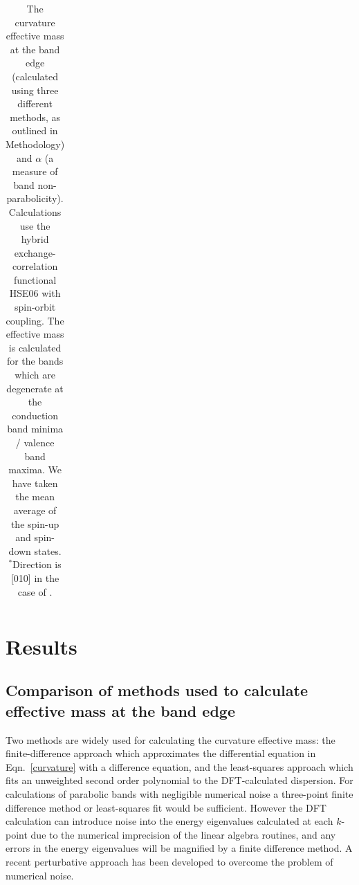 \begin{landscape}
\begin{table}[tb]
\begin{tabular}{@{}lclllclllclllclll@{}}
\end{tabular} 
\caption[Values of effective mass and $\alpha$ (a measure of non-parabolicity) for GaAs, CdTe,  and CZTS]{\label{largetable} The curvature effective mass at the band edge (calculated using three different methods, as outlined in Methodology) and $\alpha$ (a measure of band non-parabolicity). Calculations use the hybrid exchange-correlation functional HSE06 with spin-orbit coupling. The effective mass is calculated for the bands which are degenerate at the conduction band minima / valence band maxima. We have taken the mean average of the spin-up and spin-down states. $^*$Direction is [010] in the case of . }
\end{table}
\end{landscape}

\section{Results}

\subsection{Comparison of methods used to calculate effective mass at the band edge}

Two methods are widely used for calculating the curvature effective mass:
the finite-difference approach which approximates the differential equation in Eqn.\ \ref{curvature} with a difference equation,
and the least-squares approach which fits an unweighted second order polynomial to the DFT-calculated dispersion. 
For calculations of parabolic bands with negligible numerical noise a three-point finite difference method or least-squares fit would be sufficient. 
However the DFT calculation can introduce noise into the energy eigenvalues calculated at each $k$-point due to the numerical imprecision of the linear algebra routines,
and any errors in the energy eigenvalues will be magnified by a finite difference method.\autocite{Nearing2010} 
A recent perturbative approach has been developed to overcome the problem of numerical noise.\autocite{Laflamme2016} 

